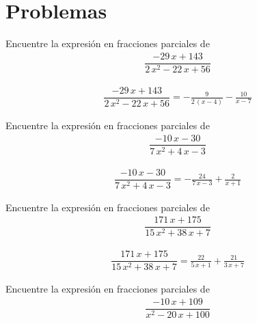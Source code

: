 \section*{Problemas}

{}
\begin{problema}
	Encuentre la expresión en fracciones parciales de
	\begin{align*}
		\dfrac{-29 \, x + 143}{2 \, x^{2} - 22 \, x + 56}
	\end{align*}
\end{problema}

\begin{align*}
	\dfrac{-29 \, x + 143}{2 \, x^{2} - 22 \, x + 56}= -\frac{9}{2 \, {\left(x - 4\right)}} - \frac{10}{x - 7}
\end{align*}


{}
\begin{problema}
	Encuentre la expresión en fracciones parciales de
	\begin{align*}
		\dfrac{-10 \, x - 30}{7 \, x^{2} + 4 \, x - 3}
	\end{align*}
\end{problema}

\begin{align*}
	\dfrac{-10 \, x - 30}{7 \, x^{2} + 4 \, x - 3}= -\frac{24}{7 \, x - 3} + \frac{2}{x + 1}
\end{align*}


{}
\begin{problema}
	Encuentre la expresión en fracciones parciales de
	\begin{align*}
		\dfrac{171 \, x + 175}{15 \, x^{2} + 38 \, x + 7}
	\end{align*}
\end{problema}

\begin{align*}
	\dfrac{171 \, x + 175}{15 \, x^{2} + 38 \, x + 7}= \frac{22}{5 \, x + 1} + \frac{21}{3 \, x + 7}
\end{align*}



{}
\begin{problema}
	Encuentre la expresión en fracciones parciales de
	\begin{align*}
		\dfrac{-10 \, x + 109}{x^{2} - 20 \, x + 100}
	\end{align*}
\end{problema}

